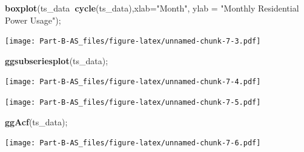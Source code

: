 \documentclass[openany]{book}
\newenvironment{Shaded}{\begin{snugshade}}{\end{snugshade}}
\newcommand{\KeywordTok}[1]{\textcolor[rgb]{0.13,0.29,0.53}{\textbf{#1}}}
\newcommand{\DataTypeTok}[1]{\textcolor[rgb]{0.13,0.29,0.53}{#1}}
\newcommand{\DecValTok}[1]{\textcolor[rgb]{0.00,0.00,0.81}{#1}}
\newcommand{\StringTok}[1]{\textcolor[rgb]{0.31,0.60,0.02}{#1}}
\newcommand{\CommentTok}[1]{\textcolor[rgb]{0.56,0.35,0.01}{\textit{#1}}}
\newcommand{\OperatorTok}[1]{\textcolor[rgb]{0.81,0.36,0.00}{\textbf{#1}}}
\newcommand{\NormalTok}[1]{#1}
\begin{document}
\begin{Shaded}
\begin{Highlighting}[]
\KeywordTok{boxplot}\NormalTok{(ts_data}\OperatorTok{~}\KeywordTok{cycle}\NormalTok{(ts_data),}\DataTypeTok{xlab=}\StringTok{"Month"}\NormalTok{, }\DataTypeTok{ylab =} \StringTok{"Monthly Residential Power Usage"}\NormalTok{);}
\end{Highlighting}
\end{Shaded}

\texttt{[image: Part-B-AS\_files/figure-latex/unnamed-chunk-7-3.pdf]}

\begin{Shaded}
\begin{Highlighting}[]
\KeywordTok{ggsubseriesplot}\NormalTok{(ts_data);}
\end{Highlighting}
\end{Shaded}

\texttt{[image: Part-B-AS\_files/figure-latex/unnamed-chunk-7-4.pdf]}

\begin{Shaded}
\end{Shaded}

\texttt{[image: Part-B-AS\_files/figure-latex/unnamed-chunk-7-5.pdf]}

\begin{Shaded}
\begin{Highlighting}[]
\KeywordTok{ggAcf}\NormalTok{(ts_data);}
\end{Highlighting}
\end{Shaded}

\texttt{[image: Part-B-AS\_files/figure-latex/unnamed-chunk-7-6.pdf]}

\begin{Shaded}
\end{Shaded}
\end{document}
